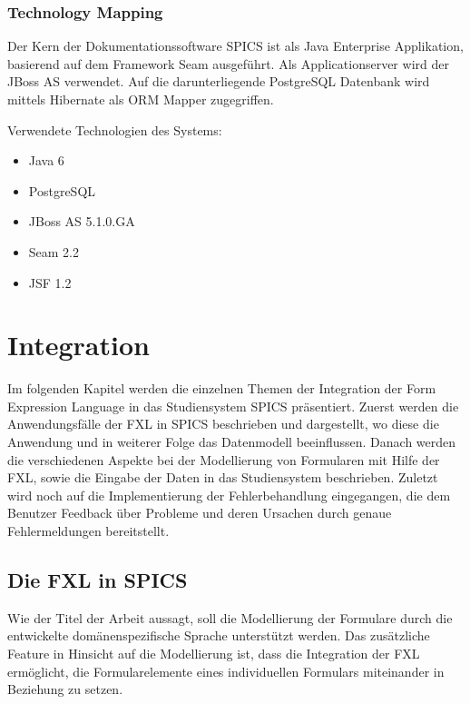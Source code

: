 \subsection{Technology Mapping}

Der Kern der Dokumentationssoftware SPICS ist als Java Enterprise Applikation, basierend auf dem Framework Seam ausgeführt. Als Applicationserver wird der JBoss AS verwendet. Auf die darunterliegende PostgreSQL Datenbank wird mittels Hibernate als ORM Mapper zugegriffen.

Verwendete Technologien des Systems:

\begin{itemize}
	\item Java 6
	\item PostgreSQL
	\item JBoss AS 5.1.0.GA
	\item Seam 2.2
	\item JSF 1.2
\end{itemize}



\chapter{Integration}


Im folgenden Kapitel werden die einzelnen Themen der Integration der Form Expression Language in das Studiensystem SPICS präsentiert. Zuerst werden die Anwendungsfälle der FXL in SPICS beschrieben und dargestellt, wo diese die Anwendung und in weiterer Folge das Datenmodell beeinflussen. Danach werden die verschiedenen Aspekte bei der Modellierung von Formularen mit Hilfe der FXL, sowie die Eingabe der Daten in das Studiensystem beschrieben. Zuletzt wird noch auf die Implementierung der Fehlerbehandlung eingegangen, die dem Benutzer Feedback über Probleme und deren Ursachen durch genaue Fehlermeldungen bereitstellt.


\section{Die FXL in SPICS}

Wie der Titel der Arbeit aussagt, soll die Modellierung der Formulare durch die entwickelte domänenspezifische Sprache unterstützt werden. Das zu\-sätz\-li\-che Feature in Hinsicht auf die Modellierung ist, dass die Integration der FXL er\-mög\-licht, die Formularelemente eines individuellen Formulars miteinander in Beziehung zu setzen.

